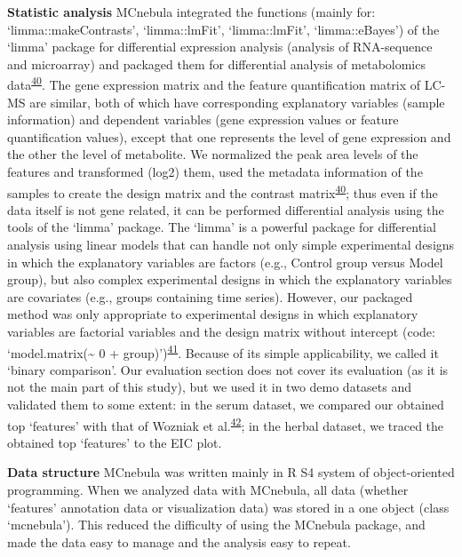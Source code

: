 \documentclass[
]{article}
\begin{document}
\textbf{Statistic analysis} MCnebula integrated the functions (mainly
for: `limma::makeContrasts', `limma::lmFit', `limma::lmFit',
`limma::eBayes') of the `limma' package for differential expression
analysis (analysis of RNA-sequence and microarray) and packaged them for
differential analysis of metabolomics
data\textsuperscript{\protect\hyperlink{ref-gentleman_limma_2005-1}{40}}.
The gene expression matrix and the feature quantification matrix of
LC-MS are similar, both of which have corresponding explanatory
variables (sample information) and dependent variables (gene expression
values or feature quantification values), except that one represents the
level of gene expression and the other the level of metabolite. We
normalized the peak area levels of the features and transformed (log2)
them, used the metadata information of the samples to create the design
matrix and the contrast
matrix\textsuperscript{\protect\hyperlink{ref-gentleman_limma_2005-1}{40}};
thus even if the data itself is not gene related, it can be performed
differential analysis using the tools of the `limma' package. The
`limma' is a powerful package for differential analysis using linear
models that can handle not only simple experimental designs in which the
explanatory variables are factors (e.g., Control group versus Model
group), but also complex experimental designs in which the explanatory
variables are covariates (e.g., groups containing time series). However,
our packaged method was only appropriate to experimental designs in
which explanatory variables are factorial variables and the design
matrix without intercept (code: `model.matrix(\textasciitilde{} 0 +
group)')\textsuperscript{\protect\hyperlink{ref-law_guide_2020}{41}}.
Because of its simple applicability, we called it `binary comparison'.
Our evaluation section does not cover its evaluation (as it is not the
main part of this study), but we used it in two demo datasets and
validated them to some extent: in the serum dataset, we compared our
obtained top `features' with that of Wozniak et
al.\textsuperscript{\protect\hyperlink{ref-2020s}{42}}; in the herbal
dataset, we traced the obtained top `features' to the EIC plot.

\textbf{Data structure} MCnebula was written mainly in R S4 system of
object-oriented programming. When we analyzed data with MCnebula, all
data (whether `features' annotation data or visualization data) was
stored in a one object (class `mcnebula'). This reduced the difficulty
of using the MCnebula package, and made the data easy to manage and the
analysis easy to repeat.
\end{document}
